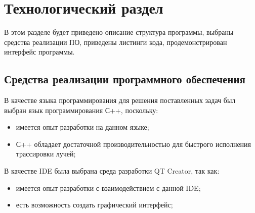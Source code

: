 \chapter{Технологический раздел}
В этом разделе будет приведено описание структура программы, выбраны средства реализации ПО, приведены листинги кода, продемонстрирован интерфейс программы.
\section{Средства реализации программного обеспечения}
В качестве языка программирования для решения поставленных задач
был выбран язык программирования С++, поскольку:
\begin{itemize}
\item имеется опыт разработки на данном языке;
\item С++ обладает достаточной производительностью для быстрого исполнения трассировки лучей;
\end{itemize}

В качестве IDE была выбрана среда разработки QT Creator, так как:
\begin{itemize}
\item имеется опыт разработки с взаимодействием с данной IDE;
\item есть возможность создать графический интерфейс;
\end{itemize}
